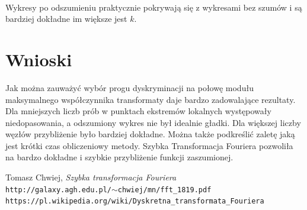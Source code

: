 \documentclass{article}
\begin{document}
\begin{figure}[H]
\centering
{}
\\
\end{figure}
Wykresy po odszumieniu praktycznie pokrywają się z wykresami bez szumów i są bardziej dokładne im większe jest $k$. 

\section{Wnioski}
Jak można zauważyć wybór progu dyskryminacji na połowę modułu maksymalnego współczynnika transformaty daje bardzo zadowalające rezultaty. Dla mniejszych liczb prób w punktach ekstremów lokalnych występowały niedopasowania, a odszumiony wykres nie był idealnie gładki. Dla większej liczby węzłów przybliżenie było bardziej dokładne. Można także podkreślić zaletę jaką jest krótki czas obliczeniowy metody. Szybka Transformacja Fouriera pozwoliła na bardzo dokładne i szybkie przybliżenie funkcji zaszumionej.

\begin{thebibliography}{1}

	Tomasz Chwiej, \emph{Szybka transformacja Fouriera} \\
	\texttt{http://galaxy.agh.edu.pl/$\sim$chwiej/mn/fft\_1819.pdf}	
	\texttt{https://pl.wikipedia.org/wiki/Dyskretna\_transformata\_Fouriera}

\end{thebibliography}
\end{document}
